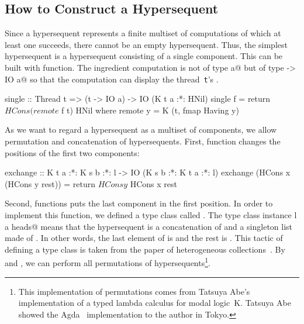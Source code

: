 \subsection{How to Construct a Hypersequent}
Since a hypersequent represents a finite multiset of computations of which
at least one succeeds, there cannot be an empty hypersequent.  Thus, the
simplest hypersequent is a hypersequent consisting of a single component.
This can be built with \verb@single@ function.
The ingredient computation is not of type \verb@IO a@ but of type
\verb@t -> IO a@ so that the computation can display the thread~\texttt{t}'s
\verb@AbstractThreadId@.
\begin{code}
single :: Thread t => (t -> IO a) -> IO (K t a :*: HNil)
single f = return $ HCons (remote $ f t) HNil
  where remote y = K (t, fmap Having y)
\end{code}

As we want to regard a hypersequent as a multiset of components, we allow
permutation and concatenation of hypersequents.
First, \verb@exchange@ function changes the positions of the first two
components:
\begin{code}
exchange :: K t a :*: K s b :*: l -> IO (K s b :*: K t a :*: l)
exchange (HCons x (HCons y rest)) = return $ HCons y $ HCons x rest
\end{code}
Second, \verb@cycling@ functions puts the last component in the first position.
In order to implement this function, we defined a type class called
\verb@HLast@.
The type class instance \verb@HLast l a heads@ means that the hypersequent \verb@l@
is a concatenation of \verb@heads@ and a singleton list made of \verb@a@.  In
other words, the last element of \verb@l@ is \verb@a@ and the rest is \verb@heads@.
This tactic of defining a type class is taken from the paper of
heterogeneous collections~\citep{hetero}.
By \verb@exchange@ and \verb@cycling@, we can perform all permutations of
hypersequents\footnote{This implementation of permutations comes from
Tatsuya Abe's
implementation of a typed
lambda calculus for modal logic~K. Tatsuya Abe
showed the Agda~\citep{agda} implementation to the author in Tokyo.}.

